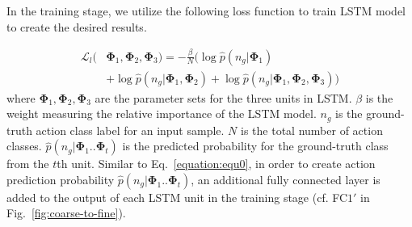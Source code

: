 \documentclass[letterpaper]{article} %
\begin{document}
In the training stage, we utilize the following loss function to train LSTM model to create the desired results.

\begin{equation}
\begin{aligned}
\mathcal{L}_l(&\mathbf{\Phi}_1,\mathbf{\Phi}_2,\mathbf{\Phi}_3)=-\frac{\beta}{N} ( \log{\hat{p}(n_g|\mathbf{\Phi}_1)}\\&+
\log{\hat{p}(n_g|\mathbf{\Phi}_1,\mathbf{\Phi}_2)}+\log{\hat{p}(n_g|\mathbf{\Phi}_1,\mathbf{\Phi}_2,\mathbf{\Phi}_3)}  )
\end{aligned}
\label{equation:equ3}
\end{equation}
where $\mathbf{\Phi}_1,\mathbf{\Phi}_2,\mathbf{\Phi}_3$ are the parameter sets for the three units in LSTM. $\beta$ is the weight measuring the relative importance of the LSTM model. $n_g$ is the ground-truth action class label for an input sample. $N$ is the total number of action classes. $\hat{p}(n_g|\mathbf{\Phi}_1..\mathbf{\Phi}_t)$ is the predicted probability for the ground-truth class from the $t$th unit. Similar to Eq.~\ref{equation:equ0}, in order to create action prediction probability $\hat{p}(n_g|\mathbf{\Phi}_1..\mathbf{\Phi}_t)$, an additional fully connected layer is added to the output of each LSTM unit in the training stage (cf. FC$1'$ in Fig.~\ref{fig:coarse-to-fine}).
\end{document}
